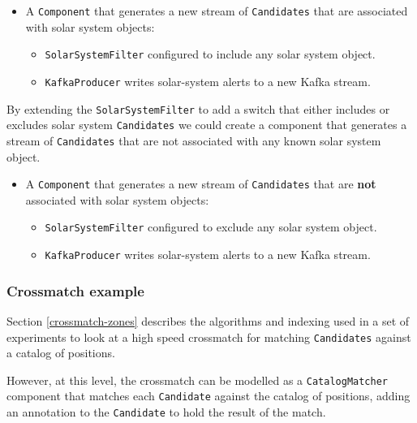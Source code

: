 \documentclass{article}
\newcommand{\kafka} {Kafka\xspace}
\newcommand{\crossmatch} {crossmatch\xspace}
\begin{document}
\begin{itemize}
    \item A \texttt{Component} that generates a new stream of \texttt{Candidates} that are associated with solar system objects:
    \begin{itemize}
        \item \texttt{SolarSystemFilter} configured to include any solar system object.
    \end{itemize}
    \begin{itemize}
        \item \texttt{KafkaProducer} writes solar-system alerts to a new \kafka stream.
    \end{itemize}
\end{itemize}

By extending the \texttt{SolarSystemFilter} to add a switch that either includes or excludes solar system \texttt{Candidates} we could create a component that generates a stream of \texttt{Candidates} that are not associated with any known solar system object.

\begin{itemize}
    \item A \texttt{Component} that generates a new stream of \texttt{Candidates} that are \textbf{not} associated with solar system objects:
    \begin{itemize}
        \item \texttt{SolarSystemFilter} configured to exclude any solar system object.
    \end{itemize}
    \begin{itemize}
        \item \texttt{KafkaProducer} writes solar-system alerts to a new \kafka stream.
    \end{itemize}
\end{itemize}

\subsubsection{Crossmatch example}
\label{workflow.cross-match}

Section \ref{crossmatch-zones} describes the algorithms and indexing used in a set of experiments to look at a high speed \crossmatch for matching \texttt{Candidates} against a catalog of positions.

However, at this level, the \crossmatch can be modelled as a \texttt{CatalogMatcher} component that matches each \texttt{Candidate} against the catalog of positions, adding an annotation to the \texttt{Candidate} to hold the result of the match.
\end{document}

